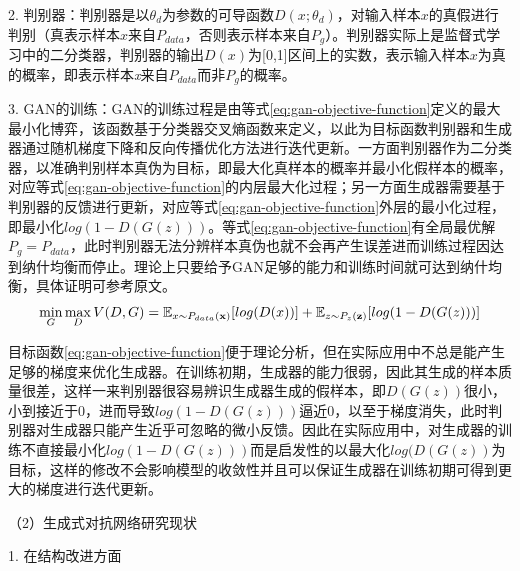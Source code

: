 2. 判别器：判别器是以$\theta_{d}$为参数的可导函数$D(x;\theta_{d})$，对输入样本$x$的真假进行判别（真表示样本$x$来自$P_{data}$，否则表示样本来自$P_{g}$）。判别器实际上是监督式学习中的二分类器，判别器的输出$D(x)$为[0,1]区间上的实数，表示输入样本$x$为真的概率，即表示样本\emph{x}来自$P_{data}$而非$P_{g}$的概率。

3. GAN的训练：GAN的训练过程是由等式\ref{eq:gan-objective-function}定义的最大最小化博弈，该函数基于分类器交叉熵函数来定义，以此为目标函数判别器和生成器通过随机梯度下降和反向传播优化方法进行迭代更新。一方面判别器作为二分类器，以准确判别样本真伪为目标，即最大化真样本的概率并最小化假样本的概率，对应等式\ref{eq:gan-objective-function}的内层最大化过程；另一方面生成器需要基于判别器的反馈进行更新，对应等式\ref{eq:gan-objective-function}外层的最小化过程，即最小化$log(1-D(G(z)))$。等式\ref{eq:gan-objective-function}有全局最优解$P_{g}=P_{data}$，此时判别器无法分辨样本真伪也就不会再产生误差进而训练过程因达到纳什均衡而停止。理论上只要给予GAN足够的能力和训练时间就可达到纳什均衡，具体证明可参考原文\cite{goodfellow2014generative}。
\begin{equation}
\label{eq:gan-objective-function}
  \min_{G}\max_{D} V(D,G) = \mathbb{E}_{x \sim P_{data}(\bf{x})}[log(D(x))] + \mathbb{E}_{z \sim P_{z}(\bf{z})}[log(1-D(G(z)))]
\end{equation}

目标函数\ref{eq:gan-objective-function}便于理论分析，但在实际应用中不总是能产生足够的梯度来优化生成器。在训练初期，生成器的能力很弱，因此其生成的样本质量很差，这样一来判别器很容易辨识生成器生成的假样本，即$D(G(z))$很小，小到接近于0，进而导致$log(1-D(G(z)))$逼近0，以至于梯度消失，此时判别器对生成器只能产生近乎可忽略的微小反馈。因此在实际应用中，对生成器的训练不直接最小化$log(1-D(G(z)))$而是启发性的以最大化$log(D(G(z))$为目标，这样的修改不会影响模型的收敛性并且可以保证生成器在训练初期可得到更大的梯度进行迭代更新。

（2）生成式对抗网络研究现状

1. 在结构改进方面

